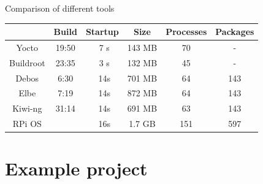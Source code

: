 \documentclass{beamer}
\begin{document}
\begin{frame}{Comparison of different tools}
	\begin{tabular}{c|ccccc}
		& \textbf{Build} & \textbf{Startup} & \textbf{Size} & \textbf{Processes} & \textbf{Packages} \\
		\hline
		Yocto & 19:50 & ~7 s & 143 MB & 70 & - \\ 
		Buildroot & 23:35 & ~3 s & 132 MB & 45 & - \\
		\hline
		Debos & 6:30 & ~14s & 701 MB & 64 & 143 \\
		Elbe & 7:19 & ~14s & 872 MB & 64 & 143 \\
		Kiwi-ng & 31:14 & ~14s & 691 MB & 63 & 143 \\
		\hline
		RPi OS & & ~16s & 1.7 GB & 151 & 597 \\
	\end{tabular}
\end{frame}

\section{Example project}
\end{document}
